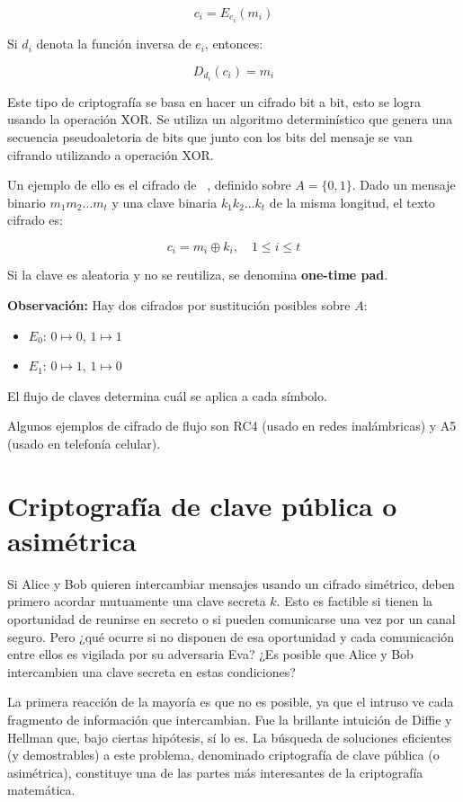 \[
c_i = E_{e_i}(m_i)
\]

Si $d_i$ denota la función inversa de $e_i$, entonces:

\[
D_{d_i}(c_i) = m_i
\]

Este tipo de criptografía se basa en hacer un cifrado bit a bit, esto se logra usando la operación XOR. Se utiliza un algoritmo determinístico que genera una secuencia pseudoaletoria de bits que junto con los bits del mensaje se van cifrando utilizando a operación XOR.

Un ejemplo de ello es el cifrado de \hyperlink{vernam-ref}{\textcolor{black}{}}~\citep{vernam}, definido sobre $A = \{0, 1\}$. Dado un mensaje binario $m_1m_2\ldots m_t$ y una clave binaria $k_1k_2\ldots k_t$ de la misma longitud, el texto cifrado es:

\[
c_i = m_i \oplus k_i, \quad 1 \leq i \leq t
\]

Si la clave es aleatoria y no se reutiliza, se denomina \textbf{one-time pad}.

\textbf{Observación:} Hay dos cifrados por sustitución posibles sobre $A$:
\begin{itemize}
    \item $E_0$: $0 \mapsto 0$, $1 \mapsto 1$
    \item $E_1$: $0 \mapsto 1$, $1 \mapsto 0$
\end{itemize}

El flujo de claves determina cuál se aplica a cada símbolo.

Algunos ejemplos de cifrado de flujo son RC4 (usado en redes inalámbricas)\cite{rc4-ietf,rc4-gfg} y A5 (usado en
telefonía celular)\cite{a5-nop,a5-ucsb}.

\section{Criptografía de clave pública o asimétrica}
Si Alice y Bob quieren intercambiar mensajes usando un cifrado simétrico, deben primero acordar mutuamente una clave secreta \(k\). Esto es factible si tienen la oportunidad de reunirse en secreto o si pueden comunicarse una vez por un canal seguro. Pero ¿qué ocurre si no disponen de esa oportunidad y cada comunicación entre ellos es vigilada por su adversaria Eva? ¿Es posible que Alice y Bob intercambien una clave secreta en estas condiciones?

La primera reacción de la mayoría es que no es posible, ya que el intruso ve cada fragmento de información que intercambian. Fue la brillante intuición de Diffie y Hellman que, bajo ciertas hipótesis, sí lo es. La búsqueda de soluciones eficientes (y demostrables) a este problema, denominado criptografía de clave pública (o asimétrica), constituye una de las partes más interesantes de la criptografía matemática.

